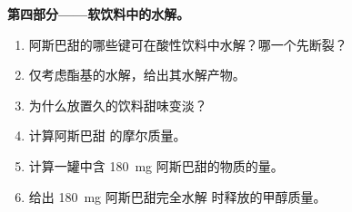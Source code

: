 \begin{problem}
\medskip
\noindent\textbf{第四部分——软饮料中的水解。}
\begin{enumerate}[resume]
  \item 阿斯巴甜的哪些键可在酸性饮料中水解？哪一个先断裂？
  \item 仅考虑酯基的水解，给出其水解产物。
  \item 为什么放置久的饮料甜味变淡？
  \item 计算阿斯巴甜  的摩尔质量。
  \item 计算一罐中含 \qty{180}{mg} 阿斯巴甜的物质的量。
  \item 给出 \qty{180}{mg} 阿斯巴甜完全水解
        时释放的甲醇质量。
\end{enumerate}
\end{problem}
